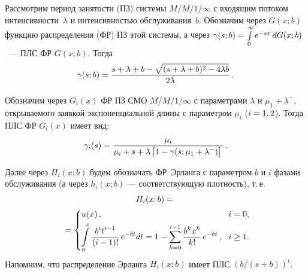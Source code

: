 \begin{multicols}{2}
Рассмотрим период занятости (ПЗ) системы $M/M/1/\infty$ с входящим потоком
интенсивности~$\lambda$ и интенсивностью обслуживания~$b$.
Обозначим через $G(x;b)$ функцию распределения (ФР) ПЗ этой системы,
а через $\gamma(s;b)\hm=\int\limits_0^{\infty} e^{-sx}\,dG(x;b)$~--- ПЛС ФР $G(x;b)$. Тогда
\begin{equation*}
\gamma(s;b)= \displaystyle\frac{\displaystyle s+\lambda+b - \sqrt{(s+\lambda+b)^2 - 4 \lambda b}
\mathstrut}{\displaystyle 2 \lambda\mathstrut}\,.
\end{equation*}

Обозначим через $G_i(x)$ ФР ПЗ СМО $M/M/1/\infty$ с параметрами $\lambda$
и $\mu_1 + \lambda^-$, открываемого заявкой экспоненциальной длины с
параметром $\mu_i$ ($i \hm=1,2$). Тогда ПЛС ФР $G_i(x)$ имеет вид:
\begin{equation*}
\gamma_i(s) = \displaystyle\frac{\displaystyle \mu_i \mathstrut}{\displaystyle \mu_i + s + \lambda\left[1 - \gamma(s;\mu_1+\lambda^-)\right]\mathstrut}\,.
\end{equation*}

Далее через $H_i(x;b)$ будем обозначать ФР~Эрланга с параметром $b$ и $i$
фазами обслуживания (а через $h_i(x;b)$ --- соответствующую плотность), т.\,е.
\begin{multline*}
H_i(x;b) = {}\\
{}=
\begin{cases}
u(x)\,,              &\! i=0, \\[3pt]
\displaystyle \int\limits_0^{x}
\displaystyle\frac{\displaystyle b^i t^{i-1}\mathstrut}{\displaystyle (i-1)!\mathstrut} \,e^{-b t} dt
= 1- \sum\limits_{k=0}^{i-1} \displaystyle\frac{\displaystyle b^k x^k \mathstrut}{\displaystyle k!\mathstrut}\, e^{-b t}\,, &\! i \ge 1.
\end{cases}\hspace*{-1.9182pt}
\end{multline*}
Напомним, что распределение Эрланга $H_i(x;b)$ имеет ПЛС
$(b/(s+b))^i$.


\end{multicols}
